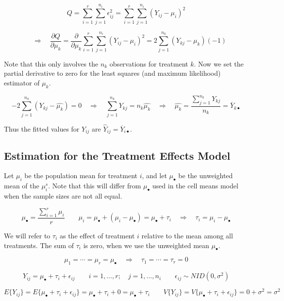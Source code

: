 \documentclass[
]{book}
\begin{document}
\[
Q=\sum_{i=1}^r\sum_{j=1}^{n_i}\epsilon_{ij}^2 
= \sum_{i=1}^r\sum_{j=1}^{n_i}\left(Y_{ij}-\mu_i\right)^2 
\]

\[
\quad \Rightarrow \quad 
\frac{\partial Q}{\partial \mu_k} = 
\frac{\partial}{\partial \mu_k}\sum_{i=1}^r\sum_{j=1}^{n_i}\left(Y_{ij}-\mu_i\right)^2
=2\sum_{j=1}^{n_k}\left(Y_{kj}-\mu_k\right)(-1)
\]

Note that this only involves the \(n_k\) observations for treatment
\(k\). Now we set the partial derivative to zero for the least squares
(and maximum likelihood) estimator of \(\mu_k\).

\[
-2\sum_{j=1}^{n_k}\left(Y_{kj}-\hat{\mu_k}\right) = 0
\quad \Rightarrow \quad \sum_{j=1}^{n_k}Y_{kj} = n_k\hat{\mu_k}
\quad \Rightarrow \quad \hat{\mu_k}= \frac{\sum_{j=1}^{n_k}Y_{kj}}{n_k}
=\overline{Y}_{k\bullet}
\]

Thus the fitted values for \(Y_{ij}\) are
\(\hat{Y}_{ij}=\overline{Y}_{i\bullet}\).

\subsection{Estimation for the Treatment Effects
Model}\label{estimation-for-the-treatment-effects-model}

Let \(\mu_i\) be the population mean for treatment \(i\), and let
\(\mu_{\bullet}\) be the unweighted mean of the \(\mu_i^s\). Note that
this will differ from \(\mu_{\bullet}\) used in the cell means model
when the sample sizes are not all equal.

\[ 
\mu_{\bullet}=\frac{\sum_{i=1}^r\mu_i}{r}  \qquad
\mu_i = \mu_{\bullet} + \left(\mu_i-\mu_{\bullet}\right) = \mu_{\bullet} + \tau_i
\quad \Rightarrow \quad \tau_i = \mu_i-\mu_{\bullet}
\]

We will refer to \(\tau_i\) as the effect of treatment \(i\) relative to
the mean among all treatments. The sum of \(\tau_i\) is zero, when we
use the unweighted mean \(\mu_{\bullet}\).

\[
\mu_1=\cdots=\mu_r=\mu_{\bullet} \quad \Rightarrow \quad
\tau_1=\cdots=\tau_r = 0
\]

\[
Y_{ij}=\mu_{\bullet} +\tau_i + \epsilon_{ij} 
\qquad i=1,\ldots,r; \quad j=1,\ldots, n_i \qquad \epsilon_{ij} \sim NID\left(0,\sigma^2\right) \]

\[ E\{Y_{ij}\} = E\{\mu_{\bullet} +\tau_i + \epsilon_{ij}\} = \mu_{\bullet} +\tau_i+0=\mu_{\bullet} +\tau_i \qquad
V\{Y_{ij}\} = V\{\mu_{\bullet} +\tau_i + \epsilon_{ij}\} = 0 +\sigma^2=\sigma^2 
\]
\end{document}
